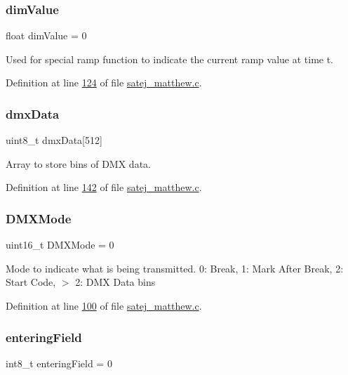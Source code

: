 \subsubsection{\texorpdfstring{dimValue}{dimValue}}
{\footnotesize\ttfamily float dim\+Value = 0}

Used for special ramp function to indicate the current ramp value at time t. 

Definition at line \mbox{\hyperlink{satej__matthew_8c_source_l00124}{124}} of file \mbox{\hyperlink{satej__matthew_8c_source}{satej\+\_\+matthew.\+c}}.

\mbox{\label{satej__matthew_8c_a94df0a1f870976c09bb86a0885b47388}} 
\subsubsection{\texorpdfstring{dmxData}{dmxData}}
{\footnotesize\ttfamily uint8\+\_\+t dmx\+Data\mbox{[}512\mbox{]}}

Array to store bins of D\+MX data. 

Definition at line \mbox{\hyperlink{satej__matthew_8c_source_l00142}{142}} of file \mbox{\hyperlink{satej__matthew_8c_source}{satej\+\_\+matthew.\+c}}.

\mbox{\label{satej__matthew_8c_a57f25f3dc6e734d597fcd5abacb04166}} 
\subsubsection{\texorpdfstring{DMXMode}{DMXMode}}
{\footnotesize\ttfamily uint16\+\_\+t D\+M\+X\+Mode = 0}

Mode to indicate what is being transmitted. 0\+: Break, 1\+: Mark After Break, 2\+: Start Code, $>$ 2\+: D\+MX Data bins 

Definition at line \mbox{\hyperlink{satej__matthew_8c_source_l00100}{100}} of file \mbox{\hyperlink{satej__matthew_8c_source}{satej\+\_\+matthew.\+c}}.

\mbox{\label{satej__matthew_8c_a946da241f5739dded95e618792fa754a}} 
\subsubsection{\texorpdfstring{enteringField}{enteringField}}
{\footnotesize\ttfamily int8\+\_\+t entering\+Field = 0}

